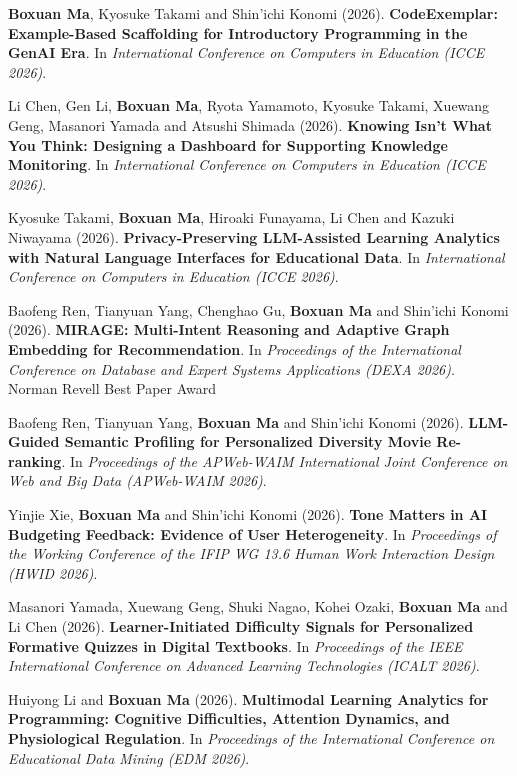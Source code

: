 \documentclass[a4paper,11pt]{article}
\begin{document}
\item[\textbf{[C.47]}] \textbf{Boxuan Ma}, Kyosuke Takami and Shin'ichi Konomi (2026). \textbf{CodeExemplar: Example-Based Scaffolding for Introductory Programming in the GenAI Era}. In \textit{International Conference on Computers in Education (ICCE 2026)}.
\item[\textbf{[C.46]}] Li Chen, Gen Li, \textbf{Boxuan Ma}, Ryota Yamamoto, Kyosuke Takami, Xuewang Geng, Masanori Yamada and Atsushi Shimada (2026). \textbf{Knowing Isn't What You Think: Designing a Dashboard for Supporting Knowledge Monitoring}. In \textit{International Conference on Computers in Education (ICCE 2026)}.
\item[\textbf{[C.45]}] Kyosuke Takami, \textbf{Boxuan Ma}, Hiroaki Funayama, Li Chen and Kazuki Niwayama (2026). \textbf{Privacy-Preserving LLM-Assisted Learning Analytics with Natural Language Interfaces for Educational Data}. In \textit{International Conference on Computers in Education (ICCE 2026)}.
\item[\textbf{[C.44]}] Baofeng Ren, Tianyuan Yang, Chenghao Gu, \textbf{Boxuan Ma} and Shin'ichi Konomi (2026). \textbf{MIRAGE: Multi-Intent Reasoning and Adaptive Graph Embedding for Recommendation}. In \textit{Proceedings of the International Conference on Database and Expert Systems Applications (DEXA 2026)}. \\ \textcolor{red!80!black}{Norman Revell Best Paper Award}
\item[\textbf{[C.43]}] Baofeng Ren, Tianyuan Yang, \textbf{Boxuan Ma} and Shin'ichi Konomi (2026). \textbf{LLM-Guided Semantic Profiling for Personalized Diversity Movie Re-ranking}. In \textit{Proceedings of the APWeb-WAIM International Joint Conference on Web and Big Data (APWeb-WAIM 2026)}.
\item[\textbf{[C.42]}] Yinjie Xie, \textbf{Boxuan Ma} and Shin'ichi Konomi (2026). \textbf{Tone Matters in AI Budgeting Feedback: Evidence of User Heterogeneity}. In \textit{Proceedings of the Working Conference of the IFIP WG 13.6 Human Work Interaction Design (HWID 2026)}.
\item[\textbf{[C.41]}] Masanori Yamada, Xuewang Geng, Shuki Nagao, Kohei Ozaki, \textbf{Boxuan Ma} and Li Chen (2026). \textbf{Learner-Initiated Difficulty Signals for Personalized Formative Quizzes in Digital Textbooks}. In \textit{Proceedings of the IEEE International Conference on Advanced Learning Technologies (ICALT 2026)}.
\item[\textbf{[C.40]}] Huiyong Li and \textbf{Boxuan Ma} (2026). \textbf{Multimodal Learning Analytics for Programming: Cognitive Difficulties, Attention Dynamics, and Physiological Regulation}. In \textit{Proceedings of the International Conference on Educational Data Mining (EDM 2026)}.
\end{document}
